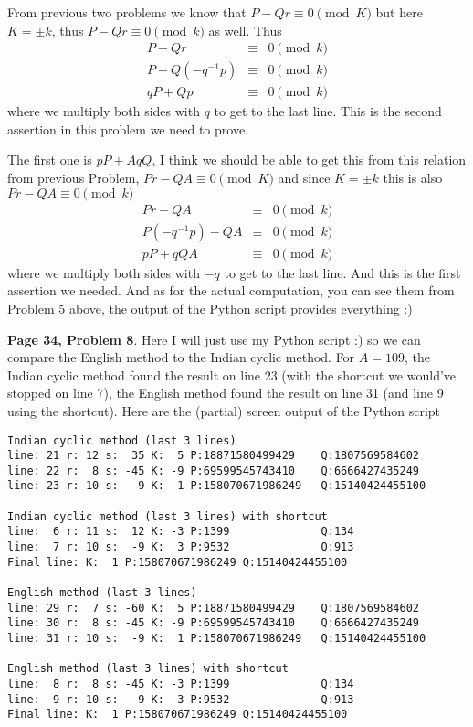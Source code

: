 \documentclass[aps,preprint,preprintnumbers,nofootinbib,showpacs,prd]{revtex4-1}
\newcommand{\nbea}{\begin{eqnarray*}}
\newcommand{\neea}{\end{eqnarray*}}
\begin{document}
From previous two problems we know that $P-Qr \equiv 0 \pmod{K}$ but here $K=\pm k$, thus $P-Qr \equiv 0 \pmod{k}$ as well. Thus
%
\nbea
P - Qr & \equiv & 0 \pmod{k} \\
P - Q(-q^{-1}p) & \equiv & 0 \pmod{k} \\
qP + Qp & \equiv & 0\pmod{k}
\neea
%
where we multiply both sides with $q$ to get to the last line. This is the second assertion in this problem we need to prove.

The first one is $pP + AqQ$, I think we should be able to get this from this relation from previous Problem, $Pr - QA \equiv 0 \pmod{K}$ and since $K=\pm k$ this is also $Pr - QA \equiv 0 \pmod{k}$
%
\nbea
Pr - QA & \equiv & 0 \pmod{k} \\
P(-q^{-1}p) - QA & \equiv & 0 \pmod{k} \\
pP + qQA & \equiv & 0 \pmod{k}
\neea
%
where we multiply both sides with $-q$ to get to the last line. And this is the first assertion we needed. And as for the actual computation, you can see them from Problem 5 above, the output of the Python script provides everything :)

{\bf Page 34, Problem 8}. Here I will just use my Python script :) so we can compare the English method to the Indian cyclic method. For $A = 109$, the Indian cyclic method found the result on line 23 (with the shortcut we would've stopped on line 7), the English method found the result on line 31 (and line 9 using the shortcut). Here are the (partial) screen output of the Python script
%
\begin{Verbatim}[baselinestretch=0.75]
Indian cyclic method (last 3 lines)
line: 21 r: 12 s:  35 K:  5 P:18871580499429    Q:1807569584602
line: 22 r:  8 s: -45 K: -9 P:69599545743410    Q:6666427435249
line: 23 r: 10 s:  -9 K:  1 P:158070671986249   Q:15140424455100

Indian cyclic method (last 3 lines) with shortcut
line:  6 r: 11 s:  12 K: -3 P:1399              Q:134        
line:  7 r: 10 s:  -9 K:  3 P:9532              Q:913        
Final line: K:  1 P:158070671986249 Q:15140424455100

English method (last 3 lines)
line: 29 r:  7 s: -60 K:  5 P:18871580499429    Q:1807569584602
line: 30 r:  8 s: -45 K: -9 P:69599545743410    Q:6666427435249
line: 31 r: 10 s:  -9 K:  1 P:158070671986249   Q:15140424455100

English method (last 3 lines) with shortcut
line:  8 r:  8 s: -45 K: -3 P:1399              Q:134        
line:  9 r: 10 s:  -9 K:  3 P:9532              Q:913        
Final line: K:  1 P:158070671986249 Q:15140424455100
\end{Verbatim}
%
\end{document}
